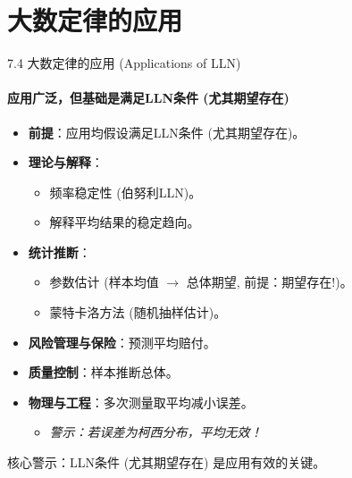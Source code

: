 \documentclass[UTF8]{beamer}
\begin{document}
\section{大数定律的应用}
\begin{frame}{7.4 大数定律的应用 (Applications of LLN)}
    \framesubtitle{应用广泛，但基础是满足LLN条件 (尤其期望存在)}
    \begin{itemize}
        \item \textbf{前提}：应用均假设满足LLN条件 (尤其\alert{期望存在})。
        \item \textbf{理论与解释}：
            \begin{itemize}
                \item \alert{频率稳定性} (伯努利LLN)。
                \item 解释平均结果的稳定趋向。
            \end{itemize}
        \item \textbf{统计推断}：
            \begin{itemize}
                \item \alert{参数估计} (样本均值 $\rightarrow$ 总体期望, \alert{前提：期望存在!})。
                \item \alert{蒙特卡洛方法} (随机抽样估计)。
            \end{itemize}
        \item \textbf{风险管理与保险}：预测平均赔付。
        \item \textbf{质量控制}：样本推断总体。
        \item \textbf{物理与工程}：多次测量取平均减小误差。
            \begin{itemize}
                \item \textit{警示：若误差为柯西分布，平均\alert{无效}！} 
            \end{itemize}
    \end{itemize}
    \vspace{0.2cm}
    \alert{核心警示}：LLN条件 (尤其期望存在) 是应用有效的关键。
\end{frame}
\end{document}

